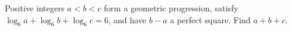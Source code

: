 Positive integers $a<b<c$ form a geometric progression, satisfy $\log_6a+\log_6b+\log_6c=6$, and have $b-a$ a perfect square. Find $a+b+c$.
